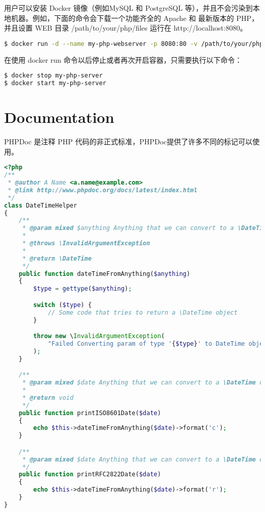 用户可以安装 Docker 镜像（例如MySQL 和 PostgreSQL 等），并且不会污染到本地机器。例如，下面的命令会下载一个功能齐全的 Apache 和 最新版本的 PHP，并且设置 WEB 目录 /path/to/your/php/files 运行在 http://localhost:8080。

\begin{lstlisting}[language=bash]
$ docker run -d --name my-php-webserver -p 8080:80 -v /path/to/your/php/files:/var/www/html/ php:apache
\end{lstlisting}

在使用 docker run 命令以后停止或者再次开启容器，只需要执行以下命令：


\begin{lstlisting}[language=bash]
$ docker stop my-php-server
$ docker start my-php-server
\end{lstlisting}



\chapter{Documentation}


PHPDoc 是注释 PHP 代码的非正式标准，PHPDoc提供了许多不同的标记可以使用。


\begin{lstlisting}[language=PHP]
<?php
/**
 * @author A Name <a.name@example.com>
 * @link http://www.phpdoc.org/docs/latest/index.html
 */
class DateTimeHelper
{
    /**
     * @param mixed $anything Anything that we can convert to a \DateTime object
     *
     * @throws \InvalidArgumentException
     *
     * @return \DateTime
     */
    public function dateTimeFromAnything($anything)
    {
        $type = gettype($anything);

        switch ($type) {
            // Some code that tries to return a \DateTime object
        }

        throw new \InvalidArgumentException(
            "Failed Converting param of type '{$type}' to DateTime object"
        );
    }

    /**
     * @param mixed $date Anything that we can convert to a \DateTime object
     *
     * @return void
     */
    public function printISO8601Date($date)
    {
        echo $this->dateTimeFromAnything($date)->format('c');
    }

    /**
     * @param mixed $date Anything that we can convert to a \DateTime object
     */
    public function printRFC2822Date($date)
    {
        echo $this->dateTimeFromAnything($date)->format('r');
    }
}
\end{lstlisting}


